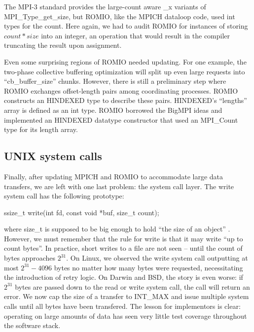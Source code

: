 The MPI-3 standard provides the large-count aware \_x variants of
MPI\_Type\_get\_size, but
ROMIO, like the MPICH dataloop code, used int types for the count.
Here again,  we had to audit ROMIO for instances of storing $count * size$
into an integer, an operation that would result in the compiler truncating the
result upon assignment.

Even some surprising regions of ROMIO needed updating. For one example, the
two-phase collective buffering optimization will split up even large requests
into ``cb\_buffer\_size'' chunks.  However, there is still a preliminary step
where ROMIO exchanges offset-length pairs among coordinating processes.  ROMIO
constructs an HINDEXED type to describe these pairs. HINDEXED's ``lengths'' array
is defined as an int type.  ROMIO borrowed the BigMPI ideas and implemented an
HINDEXED datatype constructor that used an MPI\_Count type for its length array.


\subsection{UNIX system calls}

Finally, after updating MPICH and ROMIO to accommodate large data transfers,
we are left with one last problem: the system call layer.
The write system call has the following prototype:

\begin{code}
ssize_t write(int fd, const void *buf, size_t count);
\end{code}

where size\_t is supposed to be big enough to hold ``the size of an object''
\cite{posix-std}.  However, we must remember that the rule for write is that it may
write ``up to count bytes''.  In practice, short writes to a file are not seen --
until the count of bytes approaches $2^{31}$.  On Linux, we observed 
the write system call outputting at most 
$2^{31}-4096$ bytes no matter how many bytes were requested,
necessitating the introduction of retry
logic.  On Darwin and BSD, the story is even worse: if $2^{31}$ bytes are passed
down to the read or write system call, the call will return an error.  We now
cap the size of a transfer to INT\_MAX and issue multiple system calls until
all bytes have been transfered.  The lesson for implementors is clear:
operating on large amounts of data has seen very little test coverage throughout the software stack.
